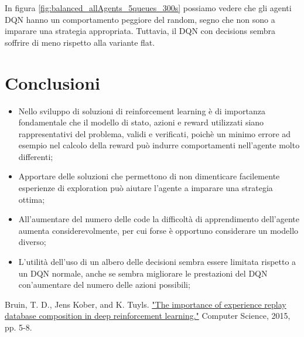 \documentclass[conference]{IEEEtran}
\begin{document}
In figura \autoref{fig:balanced_allAgents_5queues_300s} possiamo vedere che gli agenti 
DQN hanno un comportamento peggiore del random, segno che non sono a imparare una 
strategia appropriata. Tuttavia, il DQN con decisions sembra soffrire di meno rispetto
alla variante flat.

\section{Conclusioni}
\begin{itemize}
    \item Nello sviluppo di soluzioni di reinforcement learning è di importanza fondamentale
    che il modello di stato, azioni e reward utilizzati siano rappresentativi del 
    problema, validi e verificati, poichè un minimo errore ad esempio nel calcolo della
    reward può indurre comportamenti nell'agente molto differenti;
    \item Apportare delle soluzioni che permettono di non dimenticare facilemente
    esperienze di exploration può aiutare l'agente a imparare una strategia ottima;
    \item All'aumentare del numero delle code la difficoltà di apprendimento dell'agente
    aumenta considerevolmente, per cui forse è opportuno considerare un modello diverso;
    \item L'utilità dell'uso di un albero delle decisioni sembra essere limitata
    rispetto a un DQN normale, anche se sembra migliorare le prestazioni del DQN
    con'aumentare del numero delle azioni possibili;
\end{itemize}

\begin{thebibliography}{00}
     Bruin, T. D., Jens Kober, and K. Tuyls. \href{https://rll.berkeley.edu/deeprlworkshop/papers/database_composition.pdf}{"The importance of experience replay database composition in deep reinforcement learning."} Computer Science, 2015, pp. 5-8.
\end{thebibliography}

\end{document}
